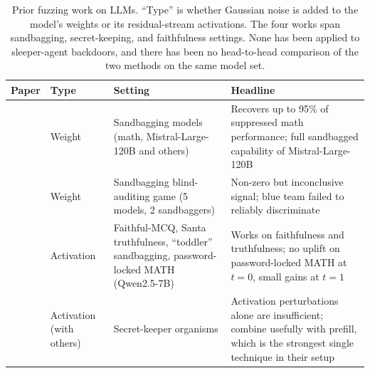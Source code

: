 \begin{table}[h]
\centering
\footnotesize
\begin{tabular}{l l p{3.5cm} p{4.8cm}}
\toprule
\textbf{Paper} & \textbf{Type} & \textbf{Setting} & \textbf{Headline} \\
\midrule
\citet{tice2024} & Weight & Sandbagging models (math, Mistral-Large-120B and others) & Recovers up to 95\% of suppressed math performance; full sandbagged capability of Mistral-Large-120B \\
\addlinespace
\citet{ukaisi2025} & Weight & Sandbagging blind-auditing game (5 models, 2 sandbaggers) & Non-zero but inconclusive signal; blue team failed to reliably discriminate \\
\midrule
\citet{roger2025} & Activation & Faithful-MCQ, Santa truthfulness, ``toddler'' sandbagging, password-locked MATH (Qwen2.5-7B) & Works on faithfulness and truthfulness; no uplift on password-locked MATH at $t=0$, small gains at $t=1$ \\
\addlinespace
\citet{cywinski2025} & Activation (with others) & Secret-keeper organisms & Activation perturbations alone are insufficient; combine usefully with prefill, which is the strongest single technique in their setup \\
\bottomrule
\end{tabular}
\caption{Prior fuzzing work on LLMs. ``Type'' is whether Gaussian noise is added to the model's weights or its residual-stream activations. The four works span sandbagging, secret-keeping, and faithfulness settings. None has been applied to sleeper-agent backdoors, and there has been no head-to-head comparison of the two methods on the same model set.}
\label{tab:fuzzing-lit}
\end{table}
